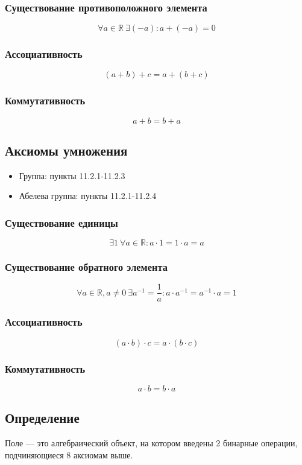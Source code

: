 \documentclass{article}
\begin{document}
\subsubsection{Существование противоположного элемента}
\[
    \forall a \in \mathbb{R} ~ \exists (-a): a + (-a) = 0
\]

\subsubsection{Ассоциативность}
\[
    (a + b) + c = a + (b + c)
\]

\subsubsection{Коммутативность}
\[
    a + b = b + a
\]


\subsection{Аксиомы умножения}
\begin{itemize}
    \item Группа: пункты 11.2.1-11.2.3
    \item Абелева группа: пункты 11.2.1-11.2.4
\end{itemize}

\subsubsection{Существование единицы}
\[
    \exists 1 ~ \forall a \in \mathbb{R}: a \cdot 1 = 1 \cdot a = a
\]

\subsubsection{Существование обратного элемента}
\[
    \forall a \in \mathbb{R}, a \neq 0 ~ \exists a^{-1} = \frac{1}{a}: a \cdot a^{-1} = a^{-1} \cdot a = 1
\]

\subsubsection{Ассоциативность}
\[
    (a \cdot b) \cdot c = a \cdot (b \cdot c)
\]

\subsubsection{Коммутативность}
\[
    a \cdot b = b \cdot a
\]


\subsection{Определение}
Поле --- это алгебраический объект, на котором введены 2 бинарные операции, подчиняющиеся 8 аксиомам выше.
\end{document}
